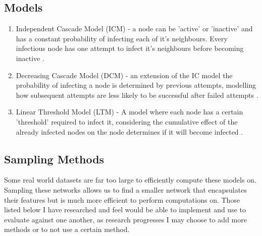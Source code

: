 \documentclass{article}
\begin{document}
\subsection{Models}
\begin{enumerate}
	\item Independent Cascade Model (ICM) - a node can be 'active' or 'inactive' and has a constant probability of infecting each of it's neighbours.
	      Every infectious node has one attempt to infect it's neighbours before becoming inactive \cite{kempe2005influential}.
	\item Decreasing Cascade Model (DCM) - an extension of the IC model the probability of infecting a node is determined by previous attempts, modelling how subsequent attempts are less likely to be successful after failed attempts \cite{kempe2005influential}.
	\item Linear Threshold Model (LTM) - A model where each node has a certain 'threshold' required to infect it, considering the cumulative effect of the already infected nodes on the node determines if it will become infected \cite{kempe2005influential}.
\end{enumerate}

\subsection{Sampling Methods}

Some real world datasets are far too large to efficiently compute these models on.
Sampling these networks allows us to find a smaller network that encapsulates their features but is much more efficient to perform computations on.
Those listed below I have researched and feel would be able to implement and use to evaluate against one another, as research progresses I may choose to add more methods or to not use a certain method.
\end{document}
